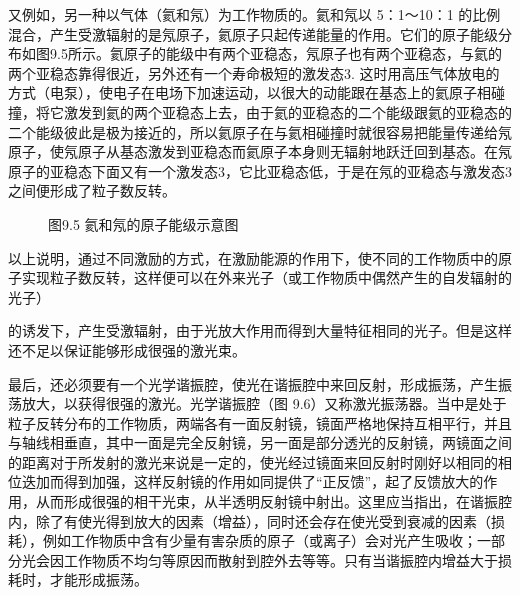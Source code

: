 又例如，另一种以气体（氦和氖）为工作物质的。氦和氖以 5：1～10：1
的比例混合，产生受激辐射的是氖原子，氦原子只起传递能量的作用。它们的原子能级分布如图9.5所示。氦原子的能级中有两个亚稳态，氖原子也有两个亚稳态，与氦的两个亚稳态靠得很近，另外还有一个寿命极短的激发态3.
这时用高压气体放电的方式（电泵），使电子在电场下加速运动，以很大的动能跟在基态上的氦原子相碰撞，将它激发到氦的两个亚稳态上去，由于氦的亚稳态的二个能级跟氦的亚稳态的二个能级彼此是极为接近的，所以氦原子在与氦相碰撞时就很容易把能量传递给氖原子，使氖原子从基态激发到亚稳态而氦原子本身则无辐射地跃迁回到基态。在氖原子的亚稳态下面又有一个激发态3，它比亚稳态低，于是在氖的亚稳态与激发态3之间便形成了粒子数反转。

\begin{figure}
\centering
\caption{图9.5 氦和氖的原子能级示意图}
\end{figure}

以上说明，通过不同激励的方式，在激励能源的作用下，使不同的工作物质中的原子实现粒子数反转，这样便可以在外来光子（或工作物质中偶然产生的自发辐射的光子）

的诱发下，产生受激辐射，由于光放大作用而得到大量特征相同的光子。但是这样还不足以保证能够形成很强的激光束。

最后，还必须要有一个光学谐振腔，使光在谐振腔中来回反射，形成振荡，产生振荡放大，以获得很强的激光。光学谐振腔（图
9.6）又称激光振荡器。当中是处于粒子反转分布的工作物质，两端各有一面反射镜，镜面严格地保持互相平行，并且与轴线相垂直，其中一面是完全反射镜，另一面是部分透光的反射镜，两镜面之间的距离对于所发射的激光来说是一定的，使光经过镜面来回反射时刚好以相同的相位迭加而得到加强，这样反射镜的作用如同提供了``正反馈''，起了反馈放大的作用，从而形成很强的相干光束，从半透明反射镜中射出。这里应当指出，在谐振腔内，除了有使光得到放大的因素（增益），同时还会存在使光受到衰减的因素（损耗），例如工作物质中含有少量有害杂质的原子（或离子）会对光产生吸收；一部分光会因工作物质不均匀等原因而散射到腔外去等等。只有当谐振腔内增益大于损耗时，才能形成振荡。

